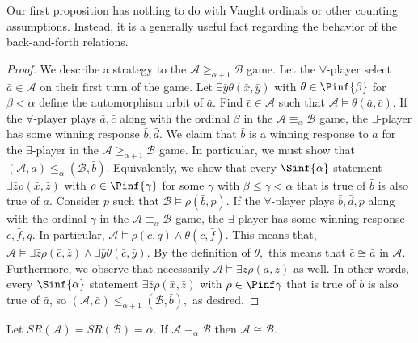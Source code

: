 \documentclass{amsart}
\renewcommand{\-}{\text{-}}
\begin{document}
Our first proposition has nothing to do with Vaught ordinals or other counting assumptions.
Instead, it is a generally useful fact regarding the behavior of the back-and-forth relations.

\uniqueminSR

\begin{proof}
    We describe a strategy to the $\mathcal{A}\geq_{\alpha+1}\mathcal{B}$ game.
    Let the $\forall$-player select $\bar{a}\in\mathcal{A}$ on their first turn of the game.
    Let $\exists\bar{y}\theta(\bar{x},\bar{y})$ with $\theta\in\Pinf{\beta}$ for $\beta<\alpha$ define the automorphism orbit of $\bar{a}$.
    Find $\bar{c}\in\mathcal{A}$ such that $\mathcal{A}\models\theta(\bar{a},\bar{c})$.
    If the $\forall$-player plays $\bar{a},\bar{c}$ along with the ordinal $\beta$ in the $\mathcal{A}\equiv_{\alpha}\mathcal{B}$ game, the $\exists$-player has some winning response $\bar{b},\bar{d}$.
    We claim that $\bar{b}$ is a winning response to $\bar{a}$ for the $\exists$-player in the $\mathcal{A}\geq_{\alpha+1}\mathcal{B}$ game.
    In particular, we must show that $(\mathcal{A},\bar{a})\leq_{\alpha}(\mathcal{B},\bar{b}).$
    Equivalently, we show that every $\Sinf{\alpha}$ statement $\exists \bar{z} \rho(\bar{x},\bar{z})$ with $\rho\in\Pinf{\gamma}$ for some $\gamma$ with $\beta\leq\gamma<\alpha$ that is true of $\bar{b}$ is also true of $\bar{a}$.
    Consider $\bar{p}$ such that $\mathcal{B}\models\rho(\bar{b},\bar{p}).$
    If the $\forall$-player plays $\bar{b},\bar{d},\bar{p}$ along with the ordinal $\gamma$ in the $\mathcal{A}\equiv_{\alpha}\mathcal{B}$ game, the $\exists$-player has some winning response $\bar{c},\bar{f},\bar{q}$.
    In particular, $\mathcal{A}\models \rho(\bar{c},\bar{q})\land \theta(\bar{c},\bar{f})$.
    This means that, $\mathcal{A}\models \exists\bar{z}\rho(\bar{c},\bar{z})\land \exists\bar{y}\theta(\bar{c},\bar{y})$.
    By the definition of $\theta,$ this means that $\bar{c}\cong\bar{a}$ in $\mathcal{A}$.
    Furthermore, we observe that necessarily $\mathcal{A}\models \exists\bar{z}\rho(\bar{a},\bar{z})$ as well.
    In other words, every  $\Sinf{\alpha}$ statement $\exists \bar{z} \rho(\bar{x},\bar{z})$ with $\rho\in\Pinf\gamma$ that is true of $\bar{b}$ is also true of $\bar{a}$, so $(\mathcal{A},\bar{a})\leq_{\alpha+1}(\mathcal{B},\bar{b}),$ as desired.
\end{proof}



\begin{corollary}\label{cor:onlyOneSRalphaPerClass}
        Let $SR(\mathcal{A})=SR(\mathcal{B})=\alpha$. If $\mathcal{A}\equiv_{\alpha}\mathcal{B}$ then $\mathcal{A}\cong\mathcal{B}$.
\end{corollary}
\end{document}
